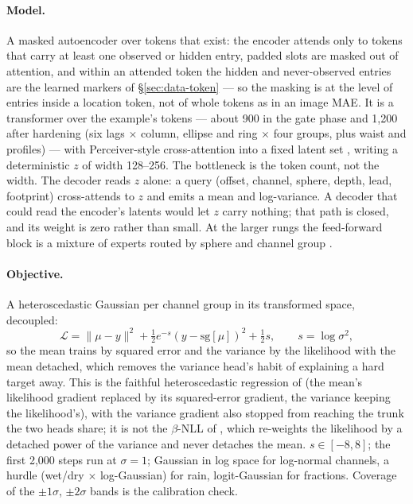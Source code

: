 \documentclass[10pt]{article}
\begin{document}
\paragraph{Model.} A masked autoencoder \cite{mae} over tokens that exist:
the encoder attends only to tokens that carry at least one observed or
hidden entry, padded slots are masked out of attention, and within an
attended token the hidden and never-observed entries are the learned markers
of \S\ref{sec:data-token} --- so the masking is at the level of entries
inside a location token, not of whole tokens as in an image MAE. It is a
transformer over the example's tokens --- about 900 in the gate phase and
1{,}200 after hardening (six lags $\times$ column, ellipse and ring $\times$
four groups, plus waist and profiles) --- with Perceiver-style
cross-attention into a fixed latent set \cite{perceiver}, writing a
deterministic $z$ of width 128--256. The bottleneck is the token count, not
the width. The decoder reads $z$ alone: a query (offset, channel, sphere,
depth, lead, footprint) cross-attends to $z$ and emits a mean and
log-variance. A decoder that could read the encoder's latents would let $z$
carry nothing; that path is closed, and its weight is zero rather than
small. At the larger rungs the feed-forward block is a mixture of experts
routed by sphere and channel group \cite{switch}.

\paragraph{Objective.} A heteroscedastic Gaussian per channel group in its
transformed space, decoupled:
\begin{equation}
\mathcal{L}=\|\mu-y\|^2+\tfrac12 e^{-s}(y-\mathrm{sg}[\mu])^2+\tfrac12 s,
\qquad s=\log\sigma^2 ,
\end{equation}
so the mean trains by squared error and the variance by the likelihood with
the mean detached, which removes the variance head's habit of explaining a
hard target away. This is the faithful heteroscedastic regression of
\cite{faithful} (the mean's likelihood gradient replaced by its squared-error
gradient, the variance keeping the likelihood's), with the variance gradient
also stopped from reaching the trunk the two heads share; it is not the
$\beta$-NLL of \cite{betanll}, which re-weights the likelihood by a detached
power of the variance and never detaches the mean. $s\in[-8,8]$; the first 2{,}000 steps run at
$\sigma=1$; Gaussian in log space for log-normal channels, a hurdle
(wet/dry $\times$ log-Gaussian) for rain, logit-Gaussian for fractions.
Coverage of the $\pm1\sigma$, $\pm2\sigma$ bands is the calibration check.
\end{document}
